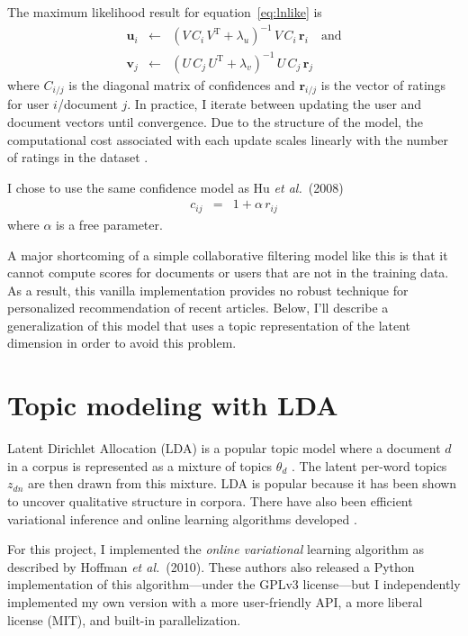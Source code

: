 \documentclass[11pt]{article}
\newcommand{\eqlabel}[1]{\label{eq:#1}}
\newcommand{\etal}{\emph{et al.}}
\begin{document}
The maximum likelihood result for equation~\ref{eq:lnlike} is \cite{icf}
\begin{eqnarray}\eqlabel{icf-update}
\mathbf{u}_i &\gets& (V\,C_i\,V^\mathrm{T}+\lambda_u)^{-1}\,
                     V\,C_i\,\mathbf{r}_i
\quad \mathrm{and} \nonumber \\
\mathbf{v}_j &\gets& (U\,C_j\,U^\mathrm{T} + \lambda_v)^{-1}\,U\,C_j\,
                     \mathbf{r}_j
\end{eqnarray}
where $C_{i/j}$ is the diagonal matrix of confidences and $\mathbf{r}_{i/j}$
is the vector of ratings for user $i$/document $j$.
In practice, I iterate between updating the user and document vectors until
convergence.
Due to the structure of the model, the computational cost associated with each
update scales linearly with the number of ratings in the dataset \cite{icf}.

I chose to use the same confidence model as Hu \etal~(2008)
\begin{eqnarray}
c_{ij} &=& 1+\alpha\,r_{ij}
\end{eqnarray}
where $\alpha$ is a free parameter.

A major shortcoming of a simple collaborative filtering model like this is
that it cannot compute scores for documents or users that are not in the
training data.
As a result, this vanilla implementation provides no robust technique for
personalized recommendation of recent articles.
Below, I'll describe a generalization of this model that uses a topic
representation of the latent dimension in order to avoid this problem.

\section{Topic modeling with LDA}

Latent Dirichlet Allocation (LDA) is a popular topic model where a document
$d$ in a corpus is represented as a mixture of topics $\theta_d$ \cite{lda}.
The latent per-word topics $z_{dn}$ are then drawn from this mixture.
LDA is popular because it has been shown to uncover qualitative structure in
corpora.
There have also been efficient variational inference and online learning
algorithms developed \cite{ovlda}.

For this project, I implemented the \emph{online variational} learning
algorithm as described by Hoffman \etal~(2010).
These authors also released a Python implementation of this algorithm---under
the GPLv3 license---but I independently implemented my own version with a more
user-friendly API, a more liberal license (MIT), and built-in parallelization.
\end{document}
